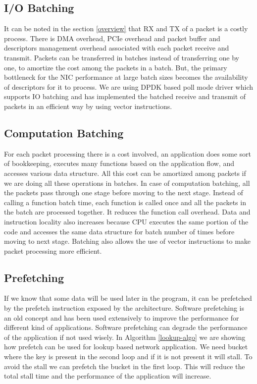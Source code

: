 \subsection{I/O Batching}
\label{iobatching}
It can be noted in the section \ref{overview} that RX and TX of a packet is a costly process. There is DMA overhead, PCIe overhead and packet buffer and descriptors management overhead associated with each packet receive and transmit. Packets can be transferred in batches instead of transferring one by one, to amortize the cost among the packets in a batch. But, the primary bottleneck for the NIC performance at large batch sizes becomes the availability of descriptors for it to process. We are using DPDK based poll mode driver which supports IO batching and has implemented the batched receive and transmit of packets in an efficient way by using vector instructions.

\subsection{Computation Batching}
\label{computationbatching}
For each packet processing there is a cost involved, an application does some sort of bookkeeping, executes many functions based on the application flow, and accesses various data structure. All this cost can be amortized among packets if we are doing all these operations in batches. In case of computation batching, all the packets pass through one stage before moving to the next stage. Instead of calling a function batch time, each function is called once and all the packets in the batch are processed together. It reduces the function call overhead. Data and instruction locality also increases because CPU executes the same portion of the code and accesses the same data structure for batch number of times before moving to next stage. Batching also allows the use of vector instructions to make packet processing more efficient.

\subsection{Prefetching}
\label{prefetching}
If we know that some data will be used later in the program, it can be prefetched by the prefetch instruction exposed by the architecture. Software prefetching is an old concept and has been used extensively to improve the performance for different kind of applications. Software prefetching can degrade the performance of the application if not used wisely. In Algorithm \ref{lookup-algo} we are showing how prefetch can be used for lookup based network application. We need bucket where the key is present in the second loop and if it is not present it will stall. To avoid the stall we can prefetch the bucket in the first loop. This will reduce the total stall time and the performance of the application will increase.

